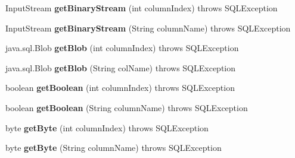 \begin{DoxyCompactItemize}
Input\+Stream {\bfseries get\+Binary\+Stream} (int column\+Index)  throws S\+Q\+L\+Exception 
\item 
\mbox{\label{classcom_1_1mysql_1_1cj_1_1jdbc_1_1result_1_1_result_set_impl_a43413f20e313d37531c3b21315720eaf}} 
Input\+Stream {\bfseries get\+Binary\+Stream} (String column\+Name)  throws S\+Q\+L\+Exception 
\item 
\mbox{\label{classcom_1_1mysql_1_1cj_1_1jdbc_1_1result_1_1_result_set_impl_a0b4c399841f795d27a558f449d63400a}} 
java.\+sql.\+Blob {\bfseries get\+Blob} (int column\+Index)  throws S\+Q\+L\+Exception 
\item 
\mbox{\label{classcom_1_1mysql_1_1cj_1_1jdbc_1_1result_1_1_result_set_impl_acb041a26eb0e7c998979cfdc6c13c9d7}} 
java.\+sql.\+Blob {\bfseries get\+Blob} (String col\+Name)  throws S\+Q\+L\+Exception 
\item 
\mbox{\label{classcom_1_1mysql_1_1cj_1_1jdbc_1_1result_1_1_result_set_impl_a7ff2d08a3f6940ee6580502e197e4d2e}} 
boolean {\bfseries get\+Boolean} (int column\+Index)  throws S\+Q\+L\+Exception 
\item 
\mbox{\label{classcom_1_1mysql_1_1cj_1_1jdbc_1_1result_1_1_result_set_impl_ab783c68052a3e7b6aeec429923cc038f}} 
boolean {\bfseries get\+Boolean} (String column\+Name)  throws S\+Q\+L\+Exception 
\item 
\mbox{\label{classcom_1_1mysql_1_1cj_1_1jdbc_1_1result_1_1_result_set_impl_ade04804d94fd16c8b083e0961540923d}} 
byte {\bfseries get\+Byte} (int column\+Index)  throws S\+Q\+L\+Exception 
\item 
\mbox{\label{classcom_1_1mysql_1_1cj_1_1jdbc_1_1result_1_1_result_set_impl_aa1836de44060d6b1a51a7faeb85ecc2b}} 
byte {\bfseries get\+Byte} (String column\+Name)  throws S\+Q\+L\+Exception 
\item 

\end{DoxyCompactItemize}
